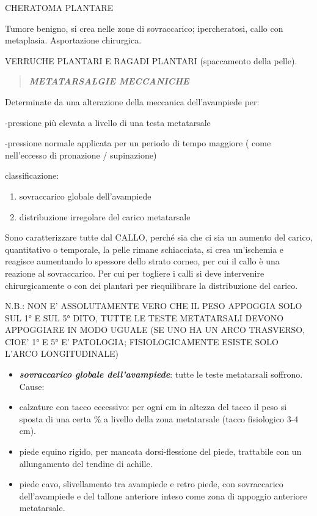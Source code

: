 \documentclass[]{article}
\begin{document}
CHERATOMA PLANTARE

Tumore benigno, si crea nelle zone di sovraccarico; ipercheratosi, callo
con metaplasia. Asportazione chirurgica.

VERRUCHE PLANTARI E RAGADI PLANTARI (spaccamento della pelle).

\begin{quote}
\textbf{\emph{METATARSALGIE MECCANICHE }}
\end{quote}

Determinate da una alterazione della meccanica dell'avampiede per:

-pressione più elevata a livello di una testa metatarsale

-pressione normale applicata per un periodo di tempo maggiore ( come
nell'eccesso di pronazione / supinazione)

classificazione:

\begin{enumerate}
\def\labelenumi{\arabic{enumi}.}
\item
  sovraccarico globale dell'avampiede
\item
  distribuzione irregolare del carico metatarsale
\end{enumerate}

Sono caratterizzare tutte dal CALLO, perché sia che ci sia un aumento
del carico, quantitativo o temporale, la pelle rimane schiacciata, si
crea un'ischemia e reagisce aumentando lo spessore dello strato corneo,
per cui il callo è una reazione al sovraccarico. Per cui per togliere i
calli si deve intervenire chirurgicamente o con dei plantari per
riequilibrare la distribuzione del carico.

N.B.: NON E' ASSOLUTAMENTE VERO CHE IL PESO APPOGGIA SOLO SUL 1° E SUL
5° DITO, TUTTE LE TESTE METATARSALI DEVONO APPOGGIARE IN MODO UGUALE (SE
UNO HA UN ARCO TRASVERSO, CIOE' 1° E 5° E' PATOLOGIA; FISIOLOGICAMENTE
ESISTE SOLO L'ARCO LONGITUDINALE)

\begin{itemize}
\item
  \textbf{\emph{sovraccarico globale dell'avampiede}}: tutte le teste
  metatarsali soffrono. Cause:
\end{itemize}

\begin{itemize}
\item
  calzature con tacco eccessivo: per ogni cm in altezza del tacco il
  peso si sposta di una certa \% a livello della zona metatarsale (tacco
  fisiologico 3-4 cm).
\item
  piede equino rigido, per mancata dorsi-flessione del piede, trattabile
  con un allungamento del tendine di achille.
\item
  piede cavo, slivellamento tra avampiede e retro piede, con
  sovraccarico dell'avampiede e del tallone anteriore inteso come zona
  di appoggio anteriore metatarsale.
\end{itemize}
\end{document}
